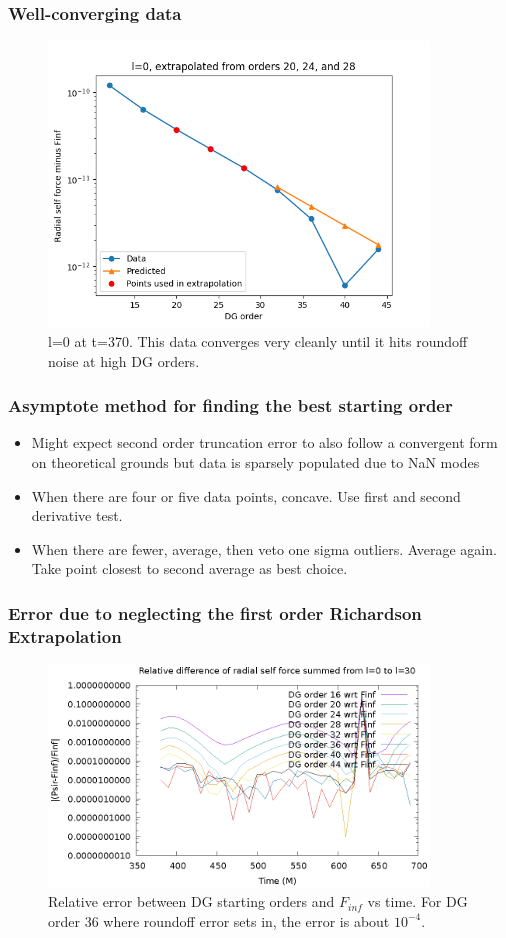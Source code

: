 \documentclass{beamer}
\begin{document}
\begin{frame}
  \frametitle{Well-converging data}
  \begin{figure}
  \includegraphics[width=0.9\textwidth]{fittingtechniqet370l0}
  \caption{l=0 at t=370. This data converges very cleanly until it hits roundoff noise at high DG orders.}
  \end{figure}
\end{frame}

\begin{frame}
  \frametitle{Asymptote method for finding the best starting order}
  \begin{itemize}
  \item Might expect second order truncation error to also follow a convergent form on theoretical grounds but data is sparsely populated due to NaN modes
  \item When there are four or five data points, concave. Use first and second derivative test.
  \item When there are fewer, average, then veto one sigma outliers. Average again. Take point closest to second average as best choice.
  \end{itemize}
\end{frame}
  

\begin{frame}
  \frametitle{Error due to neglecting the first order Richardson Extrapolation}
  \begin{figure}
    \includegraphics[width=0.9\textwidth]{reldiffpsirvtwfinfdgorders}
    \caption{Relative error between DG starting orders and $F_{inf}$ vs time. For DG order 36 where roundoff error sets in, the error is about $10^{-4}$.}
  \end{figure}
\end{frame}
\end{document}
